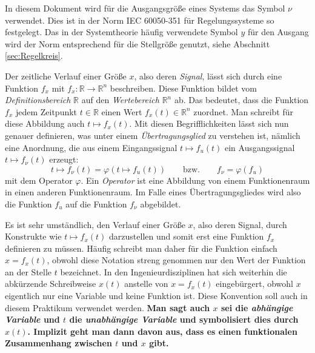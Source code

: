 \begin{RstHinweisBox}
  In diesem Dokument wird für die Ausgangsgröße eines Systems das Symbol $\nu$ verwendet. Dies ist in der Norm IEC 60050-351 für Regelungssysteme so festgelegt. Das in der Systemtheorie häufig verwendete Symbol $y$ für den Ausgang wird der Norm entsprechend für die Stellgröße genutzt, siehe Abschnitt \ref{sec:Regelkreis}.
\end{RstHinweisBox}
Der zeitliche Verlauf einer Größe $x$, also deren \emph{Signal}, lässt sich durch eine Funktion $f_x$ mit $f_x : \mathbb{R} \to \mathbb{R}^n$ beschreiben.
Diese Funktion bildet vom \emph{Definitionsbereich} $\mathbb{R}$ auf den \emph{Wertebereich} $\mathbb{R}^n$ ab.
Das bedeutet, dass die Funktion $f_x$ jedem Zeitpunkt $t \in \mathbb{R}$ einen Wert $f_x(t) \in \mathbb{R}^n$ zuordnet. Man schreibt für diese Abbildung auch $t \mapsto f_x(t)$.
Mit diesen Begrifflichkeiten lässt sich nun genauer definieren, was unter einem \emph{Übertragungsglied} zu verstehen ist, nämlich eine Anordnung, die aus einem Eingangssignal $t \mapsto f_u(t)$ ein Ausgangssignal $t \mapsto f_\nu(t)$ erzeugt:
\begin{equation} \label{eq:OperatorGenau}
  t \mapsto f_\nu(t) = \varphi(t \mapsto f_u(t)) \qquad \text{bzw.} \qquad f_\nu = \varphi(f_u)
\end{equation}
mit dem Operator $\varphi$.
Ein \emph{Operator} ist eine Abbildung von einem Funktionenraum in einen anderen Funktionenraum. Im Falle eines Übertragungsgliedes wird also die Funktion $f_u$ auf die Funktion $f_\nu$ abgebildet.

Es ist sehr umständlich, den Verlauf einer Größe $x$, also deren Signal, durch Konstrukte wie $t \mapsto f_x(t)$ darzustellen und somit erst eine Funktion $f_x$ definieren zu müssen. Häufig schreibt man daher für die Funktion einfach $x=f_x(t)$, obwohl diese Notation streng genommen nur den Wert der Funktion an der Stelle $t$ bezeichnet.
In den Ingenieurdisziplinen hat sich weiterhin die abkürzende Schreibweise $x(t)$ anstelle von $x = f_x(t)$ eingebürgert, obwohl $x$ eigentlich nur eine Variable und keine Funktion ist. Diese Konvention soll auch in diesem Praktikum verwendet werden.
\textbf{Man sagt auch $x$ sei die \emph{abhängige Variable} und $t$ die \emph{unabhängige Variable} und symbolisiert dies durch $x(t)$. Implizit geht man dann davon aus, dass es einen funktionalen Zusammenhang zwischen $t$ und $x$ gibt.}


